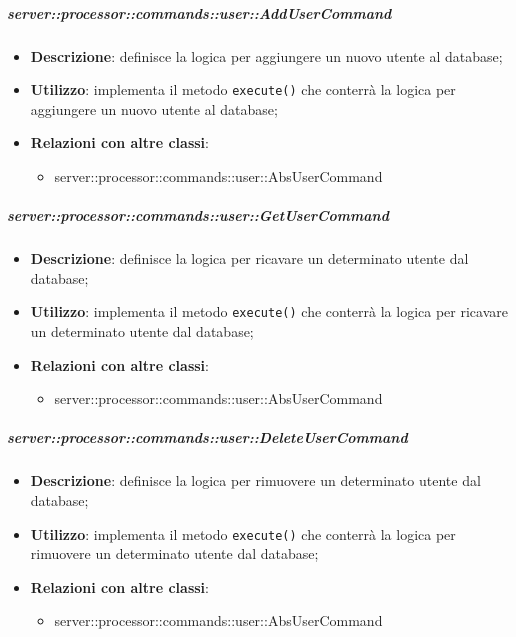         \subparagraph{server::processor::commands::user::AddUserCommand} %
        \label{subp:bdsm_app_server_processor_commands_user_addusercommand}
        \begin{itemize}
          \item \textbf{Descrizione}: definisce la logica per aggiungere un nuovo utente al database;
          \item \textbf{Utilizzo}: implementa il metodo \texttt{execute()} che conterrà la logica per aggiungere un nuovo utente al database;
          \item \textbf{Relazioni con altre classi}:
            \begin{itemize}
              \item server::processor::commands::user::AbsUserCommand
            \end{itemize}
        \end{itemize}

        \subparagraph{server::processor::commands::user::GetUserCommand} %
        \label{subp:bdsm_app_server_processor_commands_user_getusercommand}
        \begin{itemize}
          \item \textbf{Descrizione}: definisce la logica per ricavare un determinato utente dal database;
          \item \textbf{Utilizzo}: implementa il metodo \texttt{execute()} che conterrà la logica per ricavare un determinato utente dal database;
          \item \textbf{Relazioni con altre classi}:
            \begin{itemize}
              \item server::processor::commands::user::AbsUserCommand
            \end{itemize}
        \end{itemize}

        \subparagraph{server::processor::commands::user::DeleteUserCommand} %
        \label{subp:bdsm_app_server_processor_commands_user_deleteusercommand}
        \begin{itemize}
          \item \textbf{Descrizione}: definisce la logica per rimuovere un determinato utente dal database;
          \item \textbf{Utilizzo}: implementa il metodo \texttt{execute()} che conterrà la logica per rimuovere un determinato utente dal database;
          \item \textbf{Relazioni con altre classi}:
            \begin{itemize}
              \item server::processor::commands::user::AbsUserCommand
            \end{itemize}
        \end{itemize}

